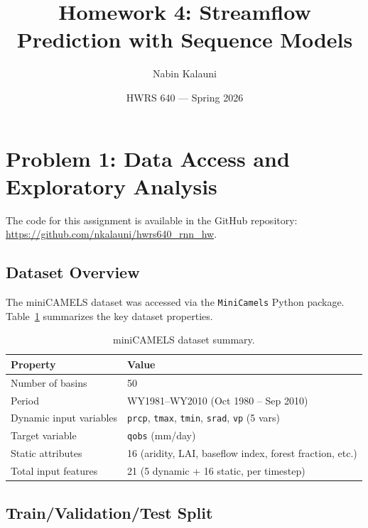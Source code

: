 \documentclass[11pt, letterpaper]{article}
\title{\textbf{Homework 4: Streamflow Prediction with Sequence Models}}
\author{Nabin Kalauni}
\date{HWRS 640 --- Spring 2026}
\begin{document}
\maketitle

\section{Problem 1: Data Access and Exploratory Analysis}

The code for this assignment is available in the GitHub repository:
\url{https://github.com/nkalauni/hwrs640_rnn_hw}.

\subsection{Dataset Overview}

The miniCAMELS dataset was accessed via the \texttt{MiniCamels} Python package.
Table~\ref{tab:dataset} summarizes the key dataset properties.

\begin{table}[H]
    \centering
    \caption{miniCAMELS dataset summary.}
    \label{tab:dataset}
    \begin{tabular}{ll}
        \toprule
        Property & Value \\
        \midrule
        Number of basins         & 50 \\
        Period                   & WY1981--WY2010 (Oct 1980 -- Sep 2010) \\
        Dynamic input variables  & \texttt{prcp}, \texttt{tmax}, \texttt{tmin}, \texttt{srad}, \texttt{vp} (5 vars) \\
        Target variable          & \texttt{qobs} (mm/day) \\
        Static attributes        & 16 (aridity, LAI, baseflow index, forest fraction, etc.) \\
        Total input features     & 21 (5 dynamic + 16 static, per timestep) \\
        \bottomrule
    \end{tabular}
\end{table}

\subsection{Train/Validation/Test Split}
\end{document}

